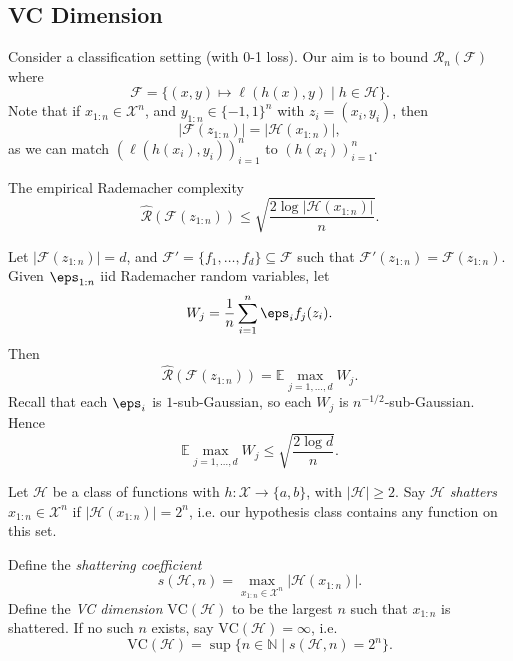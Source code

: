 \documentclass[12pt]{article}
\begin{document}
\subsection{VC Dimension}
\label{sub:vc_dim}

Consider a classification setting (with 0-1 loss). Our aim is to bound $\mathcal{R}_n(\mathcal{F})$ where
\[
	\mathcal{F} = \{(x, y) \mapsto \ell(h(x), y) \mid h \in \mathcal{H}\}.
\]
Note that if $x_{1:n} \in \mathcal{X}^n$, and $y_{1:n} \in \{-1, 1\}^n$ with $z_i = (x_i, y_i)$, then
\[
|\mathcal{F}(z_{1:n})| = |\mathcal{H}(x_{1:n})|,
\]
as we can match $(\ell(h(x_i), y_i))_{i = 1}^n$ to $(h(x_i))_{i = 1}^n$.
\begin{lemma}
	The empirical Rademacher complexity
	\[
		\hat{\mathcal{R}}(\mathcal{F}(z_{1:n})) \leq \sqrt{\frac{2 \log|\mathcal{H}(x_{1:n})|}{n}}.
	\]
\end{lemma}

\begin{proofbox}
	Let $|\mathcal{F}(z_{1:n})| = d$, and $\mathcal{F}' = \{f_1, \ldots, f_d\} \subseteq \mathcal{F}$ such that $\mathcal{F}'(z_{1:n}) = \mathcal{F}(z_{1:n})$. Given $\eps_{1:n}$ iid Rademacher random variables, let
	\[
	W_j = \frac{1}{n} \sum_{i = 1}^n \eps_i f_j(z_i).
	\]
	Then
	\[
		\hat{\mathcal{R}}(\mathcal{F}(z_{1:n})) = \mathbb{E} \max_{j = 1, \ldots, d} W_j.
	\]
	Recall that each $\eps_i$ is $1$-sub-Gaussian, so each $W_j$ is $n^{-1/2}$-sub-Gaussian. Hence
	\[
		\mathbb{E} \max_{j = 1, \ldots, d} W_j \leq \sqrt{\frac{2 \log d}{n}}.
	\]
\end{proofbox}


\begin{definition}
	Let $\mathcal{H}$ be a class of functions with $h : \mathcal{X} \to \{a, b\}$, with $|\mathcal{H}| \geq 2$. Say $\mathcal{H}$ \emph{shatters} $x_{1:n} \in \mathcal{X}^n$ if $|\mathcal{H}(x_{1:n})| = 2^n$, i.e. our hypothesis class contains any function on this set.

	Define the \emph{shattering coefficient}
	\[
	s(\mathcal{H}, n) = \max_{x_{1:n} \in \mathcal{X}^n} |\mathcal{H}(x_{1:n})|.
	\]
	Define the \emph{VC dimension} $\mathrm{VC}(\mathcal{H})$ to be the largest $n$ such that $x_{1:n}$ is shattered. If no such $n$ exists, say $\mathrm{VC}(\mathcal{H})= \infty$, i.e.
	\[
		\mathrm{VC}(\mathcal{H}) = \sup\{n \in \mathbb{N} \mid s(\mathcal{H}, n) = 2^n\}.
	\]
\end{definition}
\end{document}
